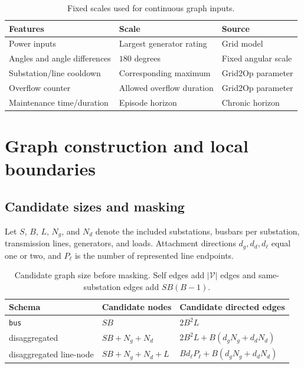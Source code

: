 \begin{table}[H]
  \centering
  \small
  \caption{Fixed scales used for continuous graph inputs.}
  \label{tab:graph-physical-scales}
  \setlength{\tabcolsep}{5pt}
  \begin{tabular}{L{0.34\textwidth}L{0.25\textwidth}L{0.31\textwidth}}
    \toprule
    Features & Scale & Source \\
    \midrule
    Power inputs & Largest generator rating & Grid model \\
    Angles and angle differences & $180$ degrees & Fixed angular scale \\
    Substation/line cooldown & Corresponding maximum & Grid2Op parameter \\
    Overflow counter & Allowed overflow duration & Grid2Op parameter \\
    Maintenance time/duration & Episode horizon & Chronic horizon \\
    \bottomrule
  \end{tabular}
\end{table}

\section{Graph construction and local boundaries}
\label{app:graph-construction}

\subsection{Candidate sizes and masking}
\label{app:graph-sizes}
\label{app:graph-indexing}

Let $S$, $B$, $L$, $N_g$, and $N_d$ denote the included substations,
busbars per substation, transmission lines, generators, and loads. Attachment
directions $d_g,d_d,d_\ell$ equal one or two, and $P_\ell$ is the number of
represented line endpoints.

\begin{table}[H]
  \centering
  \small
  \caption{Candidate graph size before masking. Self edges add
  $|\mathcal V|$ edges and same-substation edges add $SB(B-1)$.}
  \label{tab:appendix-graph-sizes}
  \setlength{\tabcolsep}{5pt}
  \begin{tabular}{L{0.24\textwidth}L{0.26\textwidth}L{0.38\textwidth}}
    \toprule
    Schema & Candidate nodes & Candidate directed edges \\
    \midrule
    \texttt{bus} & $SB$ & $2B^2L$ \\
    disaggregated & $SB+N_g+N_d$ & $2B^2L+B(d_gN_g+d_dN_d)$ \\
    disaggregated line-node & $SB+N_g+N_d+L$ & $Bd_\ell P_\ell+B(d_gN_g+d_dN_d)$ \\
    \bottomrule
  \end{tabular}
\end{table}

